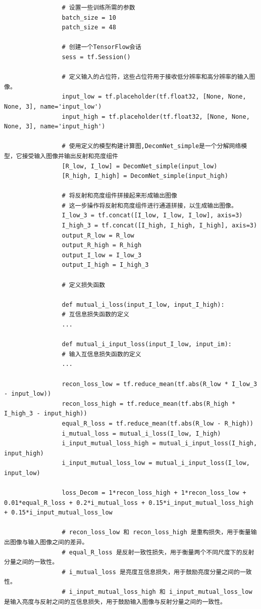 \documentclass[letterpaper,12pt]{article}
\begin{document}
			
			\lstset{language=python,breaklines=true}
			\begin{lstlisting}
				# 设置一些训练所需的参数
				batch_size = 10
				patch_size = 48
				
				# 创建一个TensorFlow会话
				sess = tf.Session()
				
				# 定义输入的占位符，这些占位符用于接收低分辨率和高分辨率的输入图像。
				input_low = tf.placeholder(tf.float32, [None, None, None, 3], name='input_low')
				input_high = tf.placeholder(tf.float32, [None, None, None, 3], name='input_high')
				
				# 使用定义的模型构建计算图,DecomNet_simple是一个分解网络模型，它接受输入图像并输出反射和亮度组件
				[R_low, I_low] = DecomNet_simple(input_low)
				[R_high, I_high] = DecomNet_simple(input_high)
				
				# 将反射和亮度组件拼接起来形成输出图像
				# 这一步操作将反射和亮度组件进行通道拼接，以生成输出图像。
				I_low_3 = tf.concat([I_low, I_low, I_low], axis=3)
				I_high_3 = tf.concat([I_high, I_high, I_high], axis=3)
				output_R_low = R_low
				output_R_high = R_high
				output_I_low = I_low_3
				output_I_high = I_high_3
				
				# 定义损失函数
				
				def mutual_i_loss(input_I_low, input_I_high):
				# 互信息损失函数的定义
				...
				
				def mutual_i_input_loss(input_I_low, input_im):
				# 输入互信息损失函数的定义
				...
				
				recon_loss_low = tf.reduce_mean(tf.abs(R_low * I_low_3 - input_low))
				recon_loss_high = tf.reduce_mean(tf.abs(R_high * I_high_3 - input_high))
				equal_R_loss = tf.reduce_mean(tf.abs(R_low - R_high))
				i_mutual_loss = mutual_i_loss(I_low, I_high)
				i_input_mutual_loss_high = mutual_i_input_loss(I_high, input_high)
				i_input_mutual_loss_low = mutual_i_input_loss(I_low, input_low)
				
				loss_Decom = 1*recon_loss_high + 1*recon_loss_low + 0.01*equal_R_loss + 0.2*i_mutual_loss + 0.15*i_input_mutual_loss_high + 0.15*i_input_mutual_loss_low
				
				# recon_loss_low 和 recon_loss_high 是重构损失，用于衡量输出图像与输入图像之间的差异。
				# equal_R_loss 是反射一致性损失，用于衡量两个不同尺度下的反射分量之间的一致性。
				# i_mutual_loss 是亮度互信息损失，用于鼓励亮度分量之间的一致性。
				# i_input_mutual_loss_high 和 i_input_mutual_loss_low 是输入亮度与反射之间的互信息损失，用于鼓励输入图像与反射分量之间的一致性。
			\end{lstlisting}
			
\end{document}
